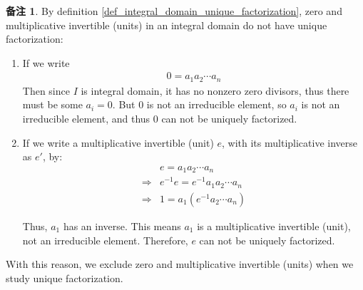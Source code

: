 \documentclass[utf8]{ctexbook}
\theoremstyle{definition}
\newtheorem{memo}{备注}[section]
\begin{document}
\begin{memo}
By definition \ref{def_integral_domain_unique_factorization}, zero and multiplicative invertible (units) in an integral domain do not have unique factorization:
\begin{enumerate}
\item{If we write 
\begin{align*}
0 = a_1 a_2 \cdots a_n
\end{align*}
Then since $I$ is integral domain, it has no nonzero zero divisors, thus there must be some $a_i = 0$. But $0$ is not an irreducible element, so $a_i$ is not an irreducible element, and thus $0$ can not be uniquely factorized.
}
\item{If we write a multiplicative invertible (unit) $e$, with its multiplicative inverse as $e'$, by:
\begin{align*}
& e = a_1 a_2 \cdots a_n \\
\Longrightarrow & e^{-1} e = e^{-1}  a_1 a_2 \cdots a_n \\
\Longrightarrow & 1 = a_1 (e^{-1}  a_2 \cdots a_n )
\end{align*}

Thus, $a_1$ has an inverse. This means $a_1$ is a multiplicative invertible (unit), not an irreducible element. Therefore, $e$ can not be uniquely factorized.
}
\end{enumerate}

With this reason, we exclude zero and multiplicative invertible (units) when we study unique factorization.
\end{memo}
\end{document}
